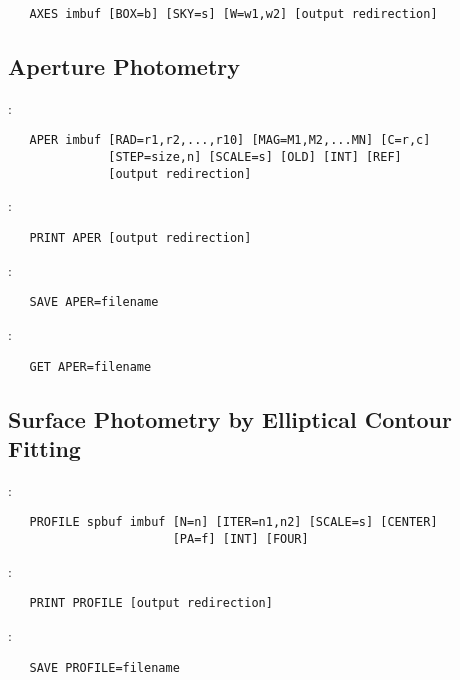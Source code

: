 \begin{verbatim}
   AXES imbuf [BOX=b] [SKY=s] [W=w1,w2] [output redirection]
\end{verbatim}

\subsection{Aperture Photometry}

:
\begin{verbatim}
   APER imbuf [RAD=r1,r2,...,r10] [MAG=M1,M2,...MN] [C=r,c]
              [STEP=size,n] [SCALE=s] [OLD] [INT] [REF]
              [output redirection]
\end{verbatim}

\noindent {}:
\begin{verbatim}
   PRINT APER [output redirection]
\end{verbatim}

\noindent {}:
\begin{verbatim}
   SAVE APER=filename
\end{verbatim}

\noindent {}:
\begin{verbatim}
   GET APER=filename
\end{verbatim}

\subsection{Surface Photometry by Elliptical Contour Fitting}

:
\begin{verbatim}
   PROFILE spbuf imbuf [N=n] [ITER=n1,n2] [SCALE=s] [CENTER]
                       [PA=f] [INT] [FOUR]
\end{verbatim}

\noindent {}:
\begin{verbatim}
   PRINT PROFILE [output redirection]
\end{verbatim}

\noindent {}:
\begin{verbatim}
   SAVE PROFILE=filename
\end{verbatim}

